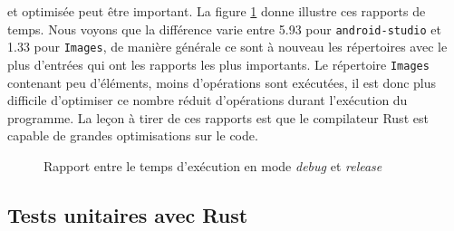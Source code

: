 et optimisée peut être important. La figure \ref{histo2} donne illustre ces rapports de temps. Nous 
voyons que la différence varie entre 5.93 pour \texttt{android-studio} et 1.33 pour 
\texttt{Images}, de manière générale ce sont à nouveau les répertoires 
avec le plus d'entrées qui ont les rapports les plus importants. Le répertoire \texttt{Images} 
contenant peu d'éléments, moins d'opérations sont exécutées, il est donc plus difficile d'optimiser ce nombre 
réduit d'opérations durant l'exécution du programme. La leçon à tirer de ces rapports est 
que le compilateur Rust est capable de grandes optimisations sur le code.
\begin{figure}
    \begin{center}
    \end{center}
    \caption{Rapport entre le temps d'exécution en mode \textit{debug} et \textit{release}}
    \label{histo2}
\end{figure}
\subsection{Tests unitaires avec Rust}
